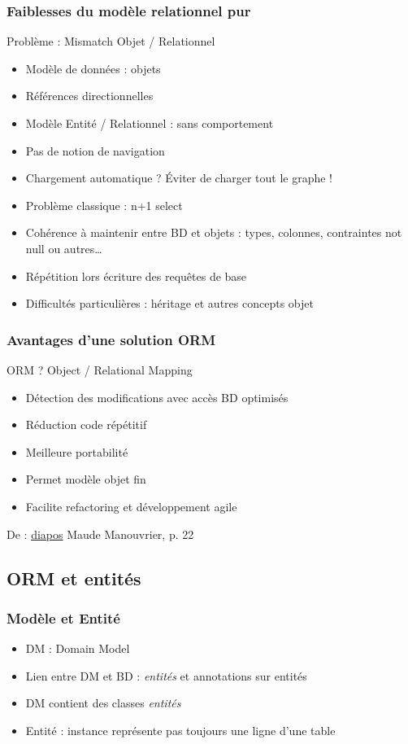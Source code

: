 \documentclass[english, french]{beamer}
\begin{document}
\begin{frame}
	\frametitle{Faiblesses du modèle relationnel pur}
	Problème : \og{}Mismatch\fg{} Objet / Relationnel
	\begin{itemize}
		\item Modèle de données : objets
		\item Références directionnelles
		\item Modèle Entité / Relationnel : sans comportement
		\item Pas de notion de navigation
		\item Chargement automatique ? \pause Éviter de charger tout le graphe !\pause
		\item Problème classique : n+1 select
		\item Cohérence à maintenir entre BD et objets : types, colonnes, contraintes not null ou autres…
		\item Répétition lors écriture des requêtes de base
		\item Difficultés particulières : héritage et autres concepts objet
	\end{itemize}
\end{frame}

\begin{frame}
	\frametitle{Avantages d’une solution ORM}
	ORM ? \pause Object / Relational Mapping \pause
	\begin{itemize}
		\item Détection des modifications avec accès BD optimisés
		\item Réduction code répétitif
		\item Meilleure portabilité
		\item Permet modèle objet fin
		\item Facilite refactoring et développement agile
	\end{itemize}
	{\tiny De : \href{http://www.lamsade.dauphine.fr/~manouvri/HIBERNATE/SLIDES/ORM.pdf}{diapos} Maude Manouvrier, p. 22}
\end{frame}

\subsection{ORM et entités}
\begin{frame}
	\frametitle{Modèle et Entité}
	\begin{itemize}
		\item DM : Domain Model
		\item Lien entre DM et BD : \emph{entités} et annotations sur entités
		\item DM contient des classes \emph{entités}
		\item Entité : instance représente {\tiny pas toujours} une ligne d’une table
	\end{itemize}
\end{frame}
\end{document}
